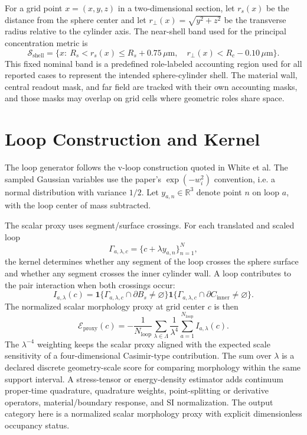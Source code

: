 \documentclass[11pt]{article}
\newcommand{\um}{\,\mu\mathrm{m}}
\newcommand{\R}{\mathbb{R}}
\newcommand{\shell}{\mathcal{S}_{\mathrm{shell}}}
\newcommand{\Eproxy}{\mathcal{E}_{\mathrm{proxy}}}
\begin{document}
For a grid point $x=(x,y,z)$ in a two-dimensional section, let $r_s(x)$ be the
distance from the sphere center and let $r_\perp(x)=\sqrt{y^2+z^2}$ be the
transverse radius relative to the cylinder axis. The near-shell band used for
the principal concentration metric is
\begin{equation}
  \shell =
  \{x:\ R_s < r_s(x) \leq R_s + 0.75\um,\quad
  r_\perp(x) < R_c - 0.10\um\}.
\end{equation}
This fixed nominal band is a predefined role-labeled accounting region used for
all reported cases to represent the intended sphere-cylinder shell. The
material wall, central readout mask, and far field are tracked with their own
accounting masks, and those masks may overlap on grid cells where geometric
roles share space.

\section{Loop Construction and Kernel}

The loop generator follows the v-loop construction quoted in White et al. The
sampled Gaussian variables use the paper's $\exp(-w_i^2)$ convention, i.e. a
normal distribution with variance $1/2$. Let $y_{a,n}\in\R^3$ denote point
$n$ on loop $a$, with the loop center of mass subtracted.

The scalar proxy uses segment/surface crossings. For each translated and
scaled loop
\begin{equation}
  \Gamma_{a,\lambda,c}=\{c+\lambda y_{a,n}\}_{n=1}^{N},
\end{equation}
the kernel determines whether any segment of the loop crosses the sphere surface
and whether any segment crosses the inner cylinder wall. A loop contributes to
the pair interaction when both crossings occur:
\begin{equation}
  I_{a,\lambda}(c)=
  \mathbf{1}\{\Gamma_{a,\lambda,c}\cap \partial B_s \neq \varnothing\}
  \mathbf{1}\{\Gamma_{a,\lambda,c}\cap \partial C_{\mathrm{inner}}\neq \varnothing\}.
\end{equation}
The normalized scalar morphology proxy at grid center $c$ is then
\begin{equation}
  \Eproxy(c) =
  -\frac{1}{N_{\mathrm{loop}}}
  \sum_{\lambda\in\Lambda}
  \frac{1}{\lambda^4}
  \sum_{a=1}^{N_{\mathrm{loop}}} I_{a,\lambda}(c).
\end{equation}
The $\lambda^{-4}$ weighting keeps the scalar proxy aligned with the expected
scale sensitivity of a four-dimensional Casimir-type contribution. The sum over
$\lambda$ is a declared discrete geometry-scale score for comparing morphology
within the same support interval. A stress-tensor or energy-density estimator
adds continuum proper-time quadrature, quadrature weights, point-splitting or
derivative operators, material/boundary response, and SI normalization. The
output category here is a normalized scalar morphology proxy with explicit
dimensionless occupancy status.
\end{document}
